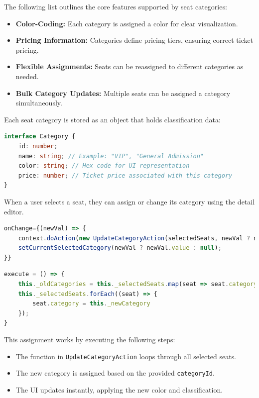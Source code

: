 The following list outlines the core features supported by seat categories:
\begin{itemize}
    \item \textbf{Color-Coding:} Each category is assigned a color for clear visualization.
    \item \textbf{Pricing Information:} Categories define pricing tiers, ensuring correct ticket pricing.
    \item \textbf{Flexible Assignments:} Seats can be reassigned to different categories as needed.
    \item \textbf{Bulk Category Updates:} Multiple seats can be assigned a category simultaneously.
\end{itemize}

Each seat category is stored as an object that holds classification data:

\begin{lstlisting}[language=TypeScript, caption=Seat Category Data Model, label=lst:seat-category-model]
interface Category {
    id: number;
    name: string; // Example: "VIP", "General Admission"
    color: string; // Hex code for UI representation
    price: number; // Ticket price associated with this category
}
\end{lstlisting}

When a user selects a seat, they can assign or change its category using the detail editor.

\begin{lstlisting}[language=TypeScript, caption=Update Category Action Call, label=lst:assign-category]
onChange={(newVal) => {
    context.doAction(new UpdateCategoryAction(selectedSeats, newVal ? newVal.value : null))
    setCurrentSelectedCategory(newVal ? newVal.value : null);
}}
\end{lstlisting}

\begin{lstlisting}[language=TypeScript, caption=Update Category Action, label=lst:assign-category]
execute = () => {
    this._oldCategories = this._selectedSeats.map(seat => seat.category)
    this._selectedSeats.forEach((seat) => {
        seat.category = this._newCategory
    });
}
\end{lstlisting}

This assignment works by executing the following steps:
\begin{itemize}
    \item The function in \texttt{UpdateCategoryAction} loops through all selected seats.
    \item The new category is assigned based on the provided \texttt{categoryId}.
    \item The UI updates instantly, applying the new color and classification.
\end{itemize}

